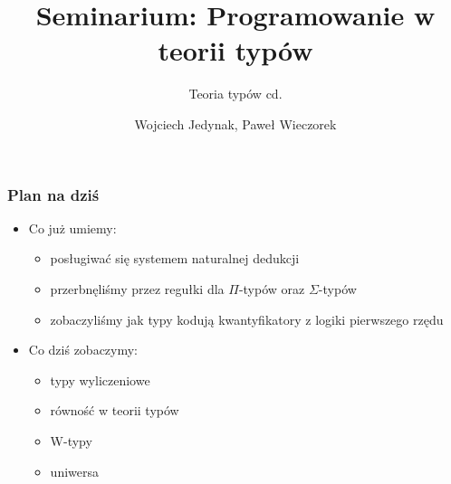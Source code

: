 \documentclass{beamer}
\title{Seminarium: Programowanie w teorii typów}
\subtitle{Teoria typów cd.}
\author{Wojciech Jedynak, Paweł Wieczorek}
\institute{Instytut Informatyki Uniwersytetu Wrocławskiego}
\begin{document}

\maketitle




\begin{frame}
\frametitle{Plan na dziś}

\begin{itemize}
 \item Co już umiemy:
 \begin{itemize}
 \item posługiwać się systemem naturalnej dedukcji
 \item przerbnęliśmy przez regułki dla $\Pi$-typów oraz $\Sigma$-typów
 \item zobaczyliśmy jak typy kodują kwantyfikatory z logiki pierwszego rzędu
 \end{itemize}

 \item Co dziś zobaczymy:
 \begin{itemize}
 \item typy wyliczeniowe
 \item równość w teorii typów
 \item W-typy
 \item uniwersa
 \end{itemize}

\end{itemize}

\end{frame}

\end{document}
